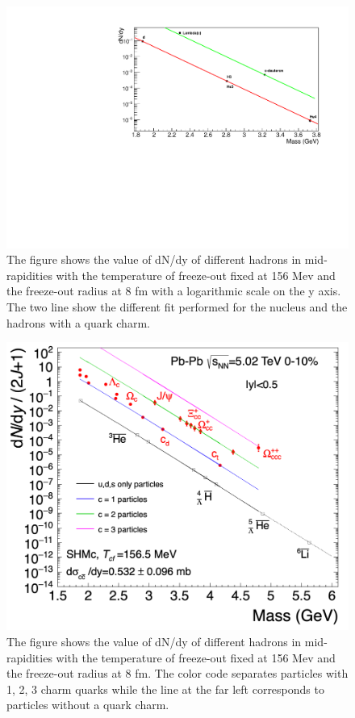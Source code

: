 \documentclass[12pt,a4paper]{book}
\begin{document}
		\begin{figure}
			\centering
		\includegraphics[width=1 \linewidth]{pictures/first_graph.pdf}
		\caption{The figure shows the value of dN/dy of different hadrons in mid-rapidities with the temperature of freeze-out fixed at 156 Mev and the freeze-out radius at 8 fm with a logarithmic scale on the y axis. The two line show the different fit performed for the nucleus and the hadrons with a quark charm.}
		\label{fig:first_graph}
	\end{figure}
			\begin{figure}
				\centering
		\includegraphics[width=1 \linewidth]{pictures/first_graph_comp.png}
		\caption{The figure shows the value of dN/dy of different hadrons in mid-rapidities with the temperature of freeze-out fixed at 156 Mev and the freeze-out radius at 8 fm. The color code separates particles with 1, 2, 3 charm quarks while the line at the far left corresponds to particles without a quark charm.}
		\label{fig:first_graph_comp}
	\end{figure}
\end{document}
